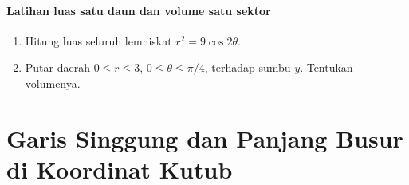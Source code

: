\documentclass{../../kalkulus-ppt}
\begin{document}
\begin{frame}{\insertsection}
    \framesubtitle{Latihan luas satu daun dan volume satu sektor}
    \begin{latihan}
        \begin{enumerate}
            \item Hitung luas seluruh lemniskat $r^2=9\cos2\theta$.
            \item Putar daerah $0\le r\le3$, $0\le\theta\le\pi/4$,
                terhadap sumbu $y$. Tentukan volumenya.
        \end{enumerate}
    \end{latihan}
\end{frame}

\section{Garis Singgung dan Panjang Busur di Koordinat Kutub}
\end{document}
